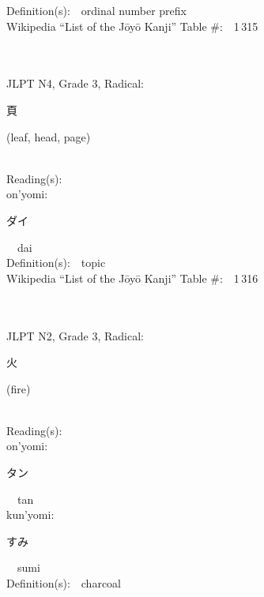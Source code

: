 \begin{multicols}{2}
Definition(s):\ \ ordinal number prefix \\
Wikipedia ``List of the J\=oy\=o Kanji'' Table \#:\ \ 1\,315 \\
\ \ \\
{\fontsize{34pt}{40pt}  }\ \ \\  %
{JLPT N4, Grade 3, Radical:\ \ {\begin{CJK}{UTF8}{min} 頁 \end{CJK}} (leaf, head, page) } \\
Reading(s):\ \ \\
{\hspace*{1em}}on'yomi:\ \ \\
{\hspace*{2em}}{\begin{CJK}{UTF8}{min} ダイ \end{CJK}}\ \ dai\ \ \\
Definition(s):\ \ topic \\
Wikipedia ``List of the J\=oy\=o Kanji'' Table \#:\ \ 1\,316 \\
\ \ \\
{\fontsize{34pt}{40pt}  }\ \ \\  %
{JLPT N2, Grade 3, Radical:\ \ {\begin{CJK}{UTF8}{min} 火 \end{CJK}} (fire) } \\
Reading(s):\ \ \\
{\hspace*{1em}}on'yomi:\ \ \\
{\hspace*{2em}}{\begin{CJK}{UTF8}{min} タン \end{CJK}}\ \ tan\ \ \\
{\hspace*{1em}}kun'yomi:\ \ \\
{\hspace*{2em}}{\begin{CJK}{UTF8}{min} すみ \end{CJK}}\ \ sumi\ \ \\
Definition(s):\ \ charcoal \\

\end{multicols}
